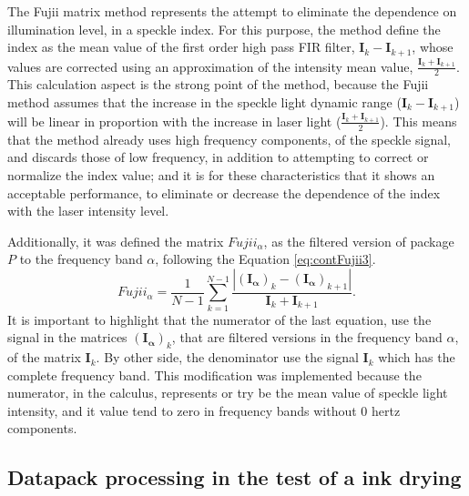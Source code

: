 \documentclass[review]{elsarticle}
\begin{document}
The Fujii matrix method represents the attempt to eliminate 
the dependence on illumination level, in a speckle index.
For this purpose, the method define the index as the mean value of the  first order high pass FIR filter, 
$\mathbf{I}_{k}-\mathbf{I}_{k+1}$,
whose values are corrected using an approximation of the intensity mean value, $\frac{\mathbf{I}_{k}+\mathbf{I}_{k+1}}{2}$.
This calculation aspect is the strong point of the method,
because the Fujii method assumes that the increase in the speckle 
light dynamic range ($\mathbf{I}_{k}-\mathbf{I}_{k+1}$) 
will be linear in proportion with the increase in laser light ($\frac{\mathbf{I}_{k}+\mathbf{I}_{k+1}}{2}$).
This means that the method already uses high frequency components, of the speckle signal, 
and discards those of low frequency, in addition  to attempting to correct or normalize the index value;
and it is for these characteristics that it shows an acceptable performance, 
to eliminate or decrease the dependence of the index with the laser intensity level.

Additionally, it was defined the matrix $Fujii_{\alpha}$, 
as the filtered version of package $P$ to the frequency band $\alpha$, following the Equation \ref{eq:contFujii3}.
\begin{equation}\label{eq:contFujii3}
Fujii_{\alpha}  = \frac{1}{N-1} \sum_{k=1}^{N-1} \frac{|\mathbf{(I_{\alpha})}_{k}-\mathbf{(I_{\alpha})}_{k+1}|}{\mathbf{I}_{k}+\mathbf{I}_{k+1}}.
\end{equation}
It is important to highlight that the numerator of the last equation, 
use the signal in the matrices $\mathbf{(I_{\alpha})}_{k}$, that are filtered versions in the frequency band $\alpha$,
of the matrix $\mathbf{I}_{k}$. 
By other side, the denominator use the signal $\mathbf{I}_{k}$ which has the complete frequency band.
This modification was implemented because the numerator, in the calculus, 
represents or try be the mean value of speckle light intensity, 
and it value tend to zero in frequency bands without 0 hertz components.


\subsection{Datapack processing in the test of a ink drying}
\label{subsec:numprocink}
\end{document}
